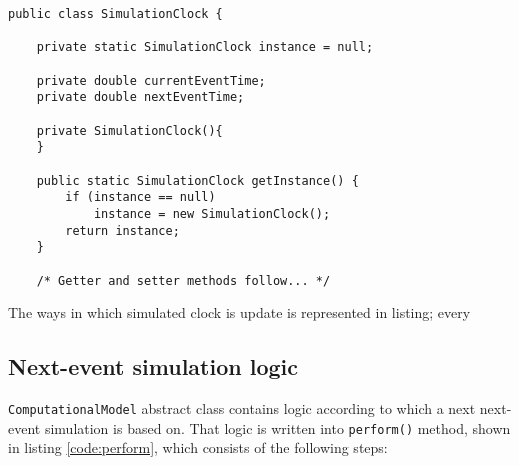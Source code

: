 \documentclass[10pt,a4paper]{article}
\begin{document}
\begin{lstlisting}[frame=lines, caption={Implementazione della funzione \texttt{start\_server}}, label={code:serverStart}]
public class SimulationClock {

    private static SimulationClock instance = null;

    private double currentEventTime;
    private double nextEventTime;

    private SimulationClock(){
    }

    public static SimulationClock getInstance() {
        if (instance == null)
            instance = new SimulationClock();
        return instance;
    }
    
    /* Getter and setter methods follow... */
\end{lstlisting}

The ways in which simulated clock is update is represented in listing; every 



\subsection{Next-event simulation logic}



\texttt{ComputationalModel} abstract class contains logic according to which a next next-event simulation is based on. That logic is written into \texttt{perform()} method, shown in listing \ref{code:perform}, which consists of the following steps:
\end{document}
